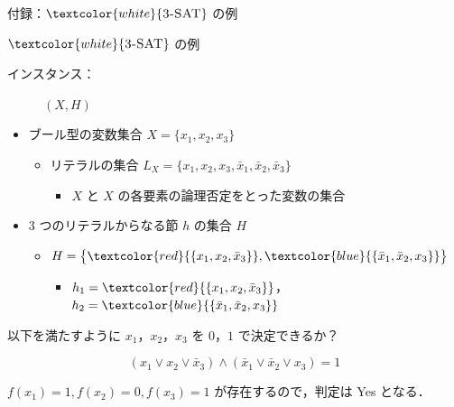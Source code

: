 \documentclass[dvipdfmx]{beamer}
\begin{document}
    \begin{frame}{付録：${\textcolor{white}{\mbox {\sc 3-SAT}}}$ の例}
      \begin{exampleblock}{${\textcolor{white}{\mbox {\sc 3-SAT}}}$ の例}
        \begin{description}
          \item[インスタンス：] $(X,H)$
          \vspace{-2mm}
        \end{description}
        \begin{itemize}
          \item ブール型の変数集合 $X=\{x_1,x_2,x_3\}$
          \begin{itemize}
            \item リテラルの集合 $L_X = \big\{ x_1,x_2,x_3,\bar x_1,\bar x_2,\bar x_3 \big\}$
            \begin{itemize}
              \item $X$ と $X$ の各要素の論理否定をとった変数の集合
            \end{itemize}
          \end{itemize}
          \item 3 つのリテラルからなる節 $h$ の集合 $H$
          \begin{itemize}
            \item $H = \big\{ \textcolor{red}{\{x_1, x_2, \bar x_3\}}, \textcolor{blue}{\{\bar x_1, \bar x_2,x_3\}}\big\}$
            \begin{itemize}
              \item $h_1 = \textcolor{red}{\{x_1, x_2, \bar x_3\}}$， $h_2 = \textcolor{blue}{\{\bar x_1, \bar x_2,x_3\}}$
            \end{itemize}
          \end{itemize}
        \end{itemize}
        \begin{description}
          \setlength{\leftskip}{-8mm}
          \item[問題：] 以下を満たすように $x_1$，$x_2$，$x_3$ を $0$，$1$ で決定できるか？
        \end{description}
        $$(x_1 \lor x_2 \lor \bar x_3) \land (\bar x_1 \lor \bar x_2 \lor  x_3) = 1$$

        $f(x_1) = 1, f(x_2) = 0, f(x_3) = 1$ が存在するので，判定は Yes となる．
      \end{exampleblock}
    \end{frame}
\end{document}
